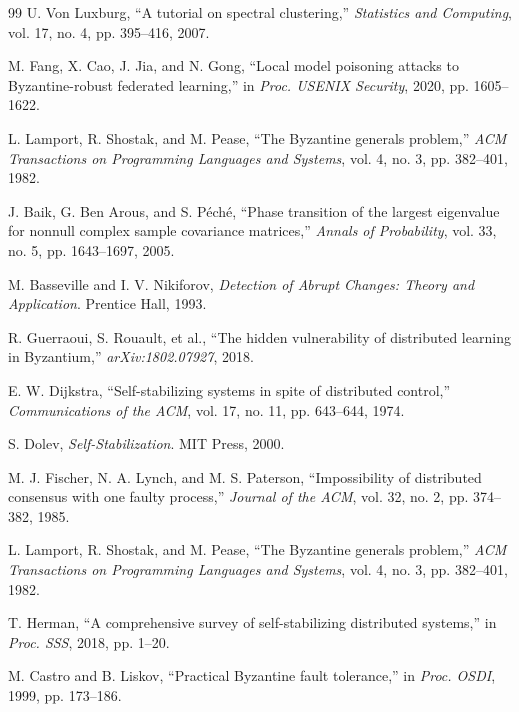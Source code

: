 \documentclass[runningheads]{llncs}
\begin{document}
\begin{thebibliography}{99}
 U. Von Luxburg, ``A tutorial on spectral clustering,'' \textit{Statistics and Computing}, vol. 17, no. 4, pp. 395--416, 2007.

 M. Fang, X. Cao, J. Jia, and N. Gong, ``Local model poisoning attacks to Byzantine-robust federated learning,'' in \textit{Proc. USENIX Security}, 2020, pp. 1605--1622.

 L. Lamport, R. Shostak, and M. Pease, ``The Byzantine generals problem,'' \textit{ACM Transactions on Programming Languages and Systems}, vol. 4, no. 3, pp. 382--401, 1982.

 J. Baik, G. Ben Arous, and S. Péché, ``Phase transition of the largest eigenvalue for nonnull complex sample covariance matrices,'' \textit{Annals of Probability}, vol. 33, no. 5, pp. 1643--1697, 2005.

 M. Basseville and I. V. Nikiforov, \textit{Detection of Abrupt Changes: Theory and Application}. Prentice Hall, 1993.

 R. Guerraoui, S. Rouault, et al., ``The hidden vulnerability of distributed learning in Byzantium,'' \textit{arXiv:1802.07927}, 2018.

 E. W. Dijkstra, ``Self-stabilizing systems in spite of distributed control,'' \textit{Communications of the ACM}, vol. 17, no. 11, pp. 643--644, 1974.

 S. Dolev, \textit{Self-Stabilization}. MIT Press, 2000.

 M. J. Fischer, N. A. Lynch, and M. S. Paterson, ``Impossibility of distributed consensus with one faulty process,'' \textit{Journal of the ACM}, vol. 32, no. 2, pp. 374--382, 1985.

 L. Lamport, R. Shostak, and M. Pease, ``The Byzantine generals problem,'' \textit{ACM Transactions on Programming Languages and Systems}, vol. 4, no. 3, pp. 382--401, 1982.

 T. Herman, ``A comprehensive survey of self-stabilizing distributed systems,'' in \textit{Proc. SSS}, 2018, pp. 1--20.

 M. Castro and B. Liskov, ``Practical Byzantine fault tolerance,'' in \textit{Proc. OSDI}, 1999, pp. 173--186.
\end{thebibliography}
\end{document}
